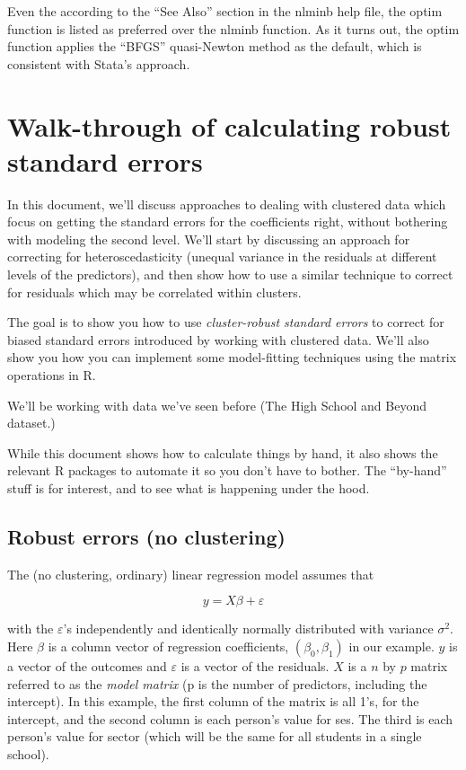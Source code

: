\documentclass[
  letterpaper,
  DIV=11,
  numbers=noendperiod]{scrreprt}
\begin{document}
Even the according to the ``See Also'' section in the nlminb help file,
the optim function is listed as preferred over the nlminb function. As
it turns out, the optim function applies the ``BFGS'' quasi-Newton
method as the default, which is consistent with Stata's approach.

\hypertarget{walk-through-of-calculating-robust-standard-errors}{%
\chapter{Walk-through of calculating robust standard
errors}\label{walk-through-of-calculating-robust-standard-errors}}

In this document, we'll discuss approaches to dealing with clustered
data which focus on getting the standard errors for the coefficients
right, without bothering with modeling the second level. We'll start by
discussing an approach for correcting for heteroscedasticity (unequal
variance in the residuals at different levels of the predictors), and
then show how to use a similar technique to correct for residuals which
may be correlated within clusters.

The goal is to show you how to use \emph{cluster-robust standard errors}
to correct for biased standard errors introduced by working with
clustered data. We'll also show you how you can implement some
model-fitting techniques using the matrix operations in R.

We'll be working with data we've seen before (The High School and Beyond
dataset.)

While this document shows how to calculate things by hand, it also shows
the relevant R packages to automate it so you don't have to bother. The
``by-hand'' stuff is for interest, and to see what is happening under
the hood.

\hypertarget{robust-errors-no-clustering}{%
\section{Robust errors (no
clustering)}\label{robust-errors-no-clustering}}

The (no clustering, ordinary) linear regression model assumes that

\[y = X\beta + \varepsilon\]

with the \(\varepsilon\)'s independently and identically normally
distributed with variance \(\sigma^2\). Here \(\beta\) is a column
vector of regression coefficients, \((\beta_0, \beta_1)\) in our
example. \(y\) is a vector of the outcomes and \(\varepsilon\) is a
vector of the residuals. \(X\) is a \(n\) by \(p\) matrix referred to as
the \emph{model matrix} (p is the number of predictors, including the
intercept). In this example, the first column of the matrix is all 1's,
for the intercept, and the second column is each person's value for ses.
The third is each person's value for sector (which will be the same for
all students in a single school).
\end{document}
